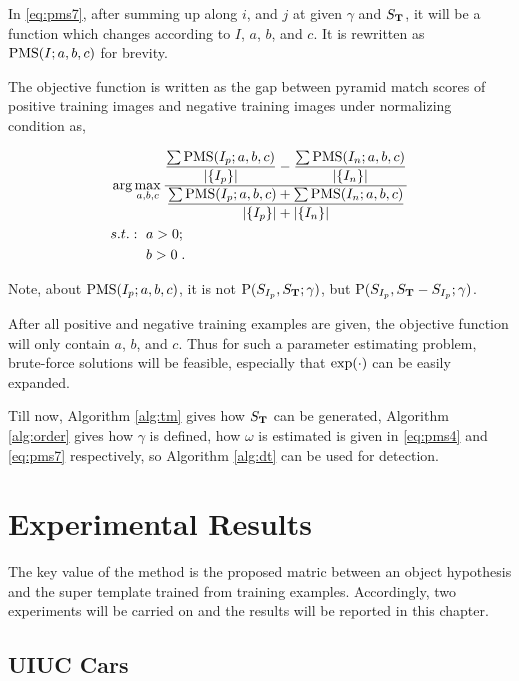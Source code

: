In \ref{eq:pms7}, after summing up along $i$, and $j$ at given $\gamma$ and $S_{\bf T}$, it will be a function which changes according to $I$, $a$, $b$, and $c$. It is rewritten as ${\rm PMS}(I;a,b,c)$ for  brevity.



The objective function is written as the gap between pyramid match scores of positive training images and negative training images under normalizing condition as,

\[\begin{aligned}
&\arg \max\limits_{a,b,c} \dfrac{ \dfrac {\sum {\rm PMS}(I_p;a,b,c)}  {|\{ I_p \}|} - \dfrac {\sum {\rm PMS}(I_n;a,b,c)}  {|\{ I_n \}|} }
{\dfrac
{{\sum {\rm PMS}(I_p;a,b,c)}+ {\sum {\rm PMS}(I_n;a,b,c) }}
{|\{ I_p \}|+|\{ I_n \}|}
}\\
&\begin{aligned}
    s.t.:\mbox{ }& a>0;\\
    &b>0\;.
\end{aligned}
\end{aligned}
\]

Note, about ${\rm PMS}(I_p;a,b,c)$, it is not ${\rm P}(S_{I_p},S_{\bf{T}};\gamma)$, but ${\rm P}(S_{I_p},S_{\bf{T}}-S_{I_p};\gamma)$.

After all positive and negative training examples are given, the objective function will only contain $a$, $b$, and $c$. Thus for such a parameter estimating problem, brute-force solutions will be feasible, especially that $\exp({\bf \cdot})$ can be easily expanded.

Till now, Algorithm \ref{alg:tm} gives how $S_{\bf T}$ can be generated,  Algorithm \ref{alg:order}  gives how $\gamma$ is defined, how $\omega$ is estimated is given in \ref{eq:pms4} and \ref{eq:pms7} respectively, so Algorithm \ref{alg:dt} can be used for detection.


\section{Experimental Results}
\label{exp5}
The key value of the method is the proposed matric between an object hypothesis and the super template trained from training examples. Accordingly, two experiments will be carried on and the results will be reported in this chapter.


\subsection{UIUC Cars}


